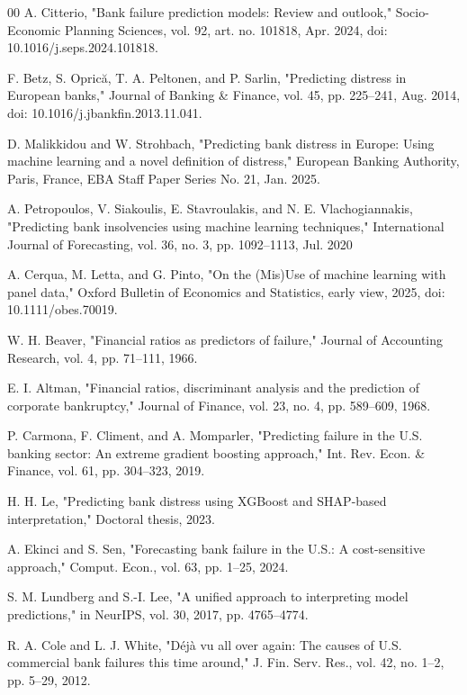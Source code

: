 \documentclass[conference]{IEEEtran}
\begin{document}
\begin{thebibliography}{00}
 A. Citterio, "Bank failure prediction models: Review and outlook," Socio-Economic Planning Sciences, vol. 92, art. no. 101818, Apr. 2024, doi: 10.1016/j.seps.2024.101818.

 F. Betz, S. Oprică, T. A. Peltonen, and P. Sarlin, "Predicting distress in European banks," Journal of Banking \& Finance, vol. 45, pp. 225–241, Aug. 2014, doi: 10.1016/j.jbankfin.2013.11.041.

 D. Malikkidou and W. Strohbach, "Predicting bank distress in Europe: Using machine learning and a novel definition of distress," European Banking Authority, Paris, France, EBA Staff Paper Series No. 21, Jan. 2025.

 A. Petropoulos, V. Siakoulis, E. Stavroulakis, and N. E. Vlachogiannakis, "Predicting bank insolvencies using machine learning techniques," International Journal of Forecasting, vol. 36, no. 3, pp. 1092–1113, Jul. 2020

 A. Cerqua, M. Letta, and G. Pinto, "On the (Mis)Use of machine learning with panel data," Oxford Bulletin of Economics and Statistics, early view, 2025, doi: 10.1111/obes.70019.

 W. H. Beaver, "Financial ratios as predictors of failure," Journal of Accounting Research, vol. 4, pp. 71–111, 1966.

 E. I. Altman, "Financial ratios, discriminant analysis and the prediction of corporate bankruptcy," Journal of Finance, vol. 23, no. 4, pp. 589–609, 1968.

 P. Carmona, F. Climent, and A. Momparler, "Predicting failure in the U.S. banking sector: An extreme gradient boosting approach," Int. Rev. Econ. \& Finance, vol. 61, pp. 304–323, 2019.

 H. H. Le, "Predicting bank distress using XGBoost and SHAP-based interpretation," Doctoral thesis, 2023.

 A. Ekinci and S. Sen, "Forecasting bank failure in the U.S.: A cost-sensitive approach," Comput. Econ., vol. 63, pp. 1–25, 2024.

 S. M. Lundberg and S.-I. Lee, "A unified approach to interpreting model predictions," in NeurIPS, vol. 30, 2017, pp. 4765–4774.

 R. A. Cole and L. J. White, "Déjà vu all over again: The causes of U.S. commercial bank failures this time around," J. Fin. Serv. Res., vol. 42, no. 1–2, pp. 5–29, 2012.


\end{thebibliography}
\end{document}
